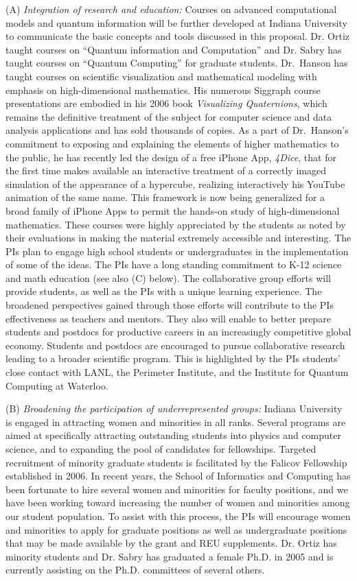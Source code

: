 \documentclass{article}
\theoremstyle{remark}
\begin{document}
\noindent (A) {\em Integration of research and education:} Courses on
advanced computational models and quantum information will be further
developed at Indiana University to communicate the basic concepts and
tools discussed in this proposal. Dr. Ortiz taught courses on
``Quantum information and Computation'' and Dr. Sabry has taught
courses on ``Quantum Computing'' for graduate students.  Dr.\ Hanson
has taught courses on scientific visualization and mathematical
modeling with emphasis on high-dimensional mathematics.  His numerous
Siggraph course presentations are embodied in his 2006 book {\it
  Visualizing Quaternions\/}, which remains the definitive treatment
of the subject for computer science and data analysis applications and
has sold thousands of copies. As a part of Dr.\ Hanson's commitment to
exposing and explaining the elements of higher mathematics to the
public, he has recently led the design of a free iPhone App, {\it
  4Dice\/}, that for the first time makes available an interactive
treatment of a correctly imaged simulation of the appearance of a
hypercube, realizing interactively his YouTube animation of the same
name.  This framework is now being generalized for a broad family of
iPhone Apps to permit the hands-on study of high-dimensional
mathematics.  These courses were highly appreciated by the students as
noted by their evaluations in making the material extremely accessible
and interesting.  The PIs plan to engage high school students or
undergraduates in the implementation of some of the ideas.  The PIs
have a long standing commitment to K-12 science and math education
(see also (C) below). The collaborative group efforts will provide
students, as well as the PIs with a unique learning experience. The
broadened perspectives gained through those efforts will contribute to
the PIs effectiveness as teachers and mentors. They also will enable
to better prepare students and postdocs for productive careers in an
increasingly competitive global economy. Students and postdocs are
encouraged to pursue collaborative research leading to a broader
scientific program. This is highlighted by the PIs students' close
contact with LANL, the Perimeter Institute, and the Institute for
Quantum Computing at Waterloo.

\medskip
\noindent (B) {\em Broadening the participation of underrepresented groups:}
Indiana University is engaged in attracting women and minorities in all
ranks. Several programs are aimed at specifically attracting outstanding
students into physics and computer science, and to expanding the pool of
candidates for fellowships. Targeted recruitment of minority graduate
students is facilitated by the Falicov Fellowship established in 2006. In
recent years, the School of Informatics and Computing has been fortunate to
hire several women and minorities for faculty positions, and we have been
working toward increasing the number of women and minorities among our
student population. To assist with this process, the PIs will encourage women
and minorities to apply for graduate positions as well as undergraduate
positions that may be made available by the grant and REU
supplements. Dr. Ortiz has minority students and Dr. Sabry has graduated a
female Ph.D. in 2005 and is currently assisting on the Ph.D. committees of
several others. 
\end{document}
